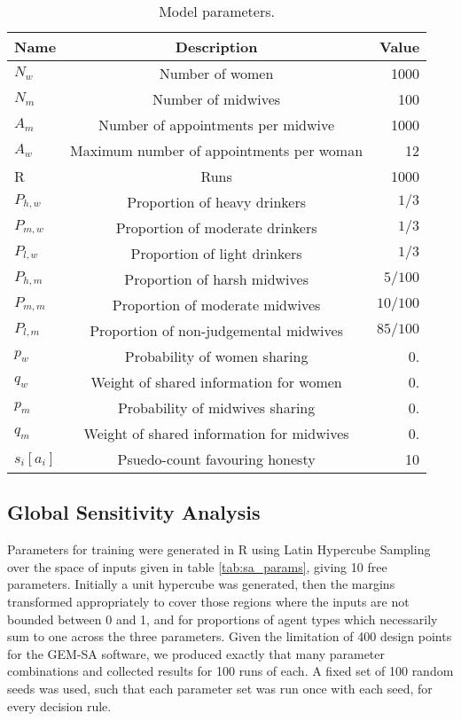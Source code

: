 \begin{table}
\center
\begin{tabular} {|l | c | r|}
\hline
Name & Description & Value \\ \hline
\(N_{w}\) & Number of women & 1000 \\ \hline
\(N_{m}\) & Number of midwives & 100 \\ \hline
\(A_{m}\) & Number of appointments per midwive & 1000 \\ \hline
\(A_{w}\) & Maximum number of appointments per woman & 12 \\ \hline
R & Runs & 1000 \\ \hline
\(P_{h,w}\) & Proportion of heavy drinkers & \(1/3\) \\ \hline
\(P_{m,w}\) & Proportion of moderate drinkers & \(1/3\) \\ \hline
\(P_{l,w}\) & Proportion of light drinkers & \(1/3\) \\ \hline
\(P_{h,m}\) & Proportion of harsh midwives & \(5/100\) \\ \hline
\(P_{m,m}\) & Proportion of moderate midwives & \(10/100\) \\ \hline
\(P_{l,m}\) & Proportion of non-judgemental midwives & \(85/100\) \\ \hline
\(p_{w}\) & Probability of women sharing & 0. \\ \hline
\(q_{w}\) & Weight of shared information for women & 0. \\ \hline
\(p_{m}\) & Probability of midwives sharing & 0. \\ \hline
\(q_{m}\) & Weight of shared information for midwives & 0. \\ \hline
\(s_{i}[a_{i}]\) & Psuedo-count favouring honesty & 10 \\ \hline
\end{tabular}
\caption[Table caption text]{Model parameters. \label{tab:qt_params}}
\end{table}
\subsection{Global Sensitivity Analysis}
\label{sub:sensitivity}
 \cite{Bijak2013b}

Parameters for training were generated in R \citep{RTeam2014} using Latin Hypercube Sampling \citep{Carnell2012} over the space of inputs given in table \ref{tab:sa_params}, giving 10 free parameters. Initially a unit hypercube was generated, then the margins transformed appropriately to cover those regions where the inputs are not bounded between 0 and 1, and for proportions of agent types which necessarily sum to one across the three parameters. Given the limitation of 400 design points for the \ac{GEM-SA} software, we produced exactly that many parameter combinations and collected results for 100 runs of each. A fixed set of 100 random seeds was used, such that each parameter set was run once with each seed, for every decision rule.

